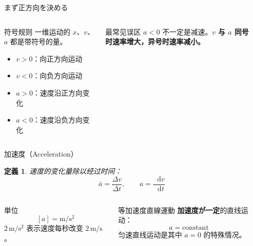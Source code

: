 \documentclass[notheorems,aspectratio=169]{beamer}
\newtheorem{definition}{定義}
\newcommand{\jp}[1]{\textbf{\color{JapanBlue}#1}}
\newcommand{\key}[1]{\textbf{\color{ChinaRed}#1}}
\newcommand{\dd}{\mathop{}\!\mathrm{d}}
\newcommand{\unit}[1]{\,\mathrm{#1}}
\begin{document}
\begin{frame}{まず正方向を決める}
  \begin{columns}[T,onlytextwidth]
    \begin{block}{符号规则}
      一维运动的 $x$、$v$、$a$ 都是带符号的量。
      \begin{itemize}
        \item $v>0$：向正方向运动
        \item $v<0$：向负方向运动
        \item $a>0$：速度沿正方向变化
        \item $a<0$：速度沿负方向变化
      \end{itemize}
    \end{block}
    \begin{alertblock}{最常见误区}
      $a<0$ 不一定是减速。\key{$v$ 与 $a$ 同号时速率增大，异号时速率减小。}
    \end{alertblock}

    \begin{center}
    \end{center}
  \end{columns}
\end{frame}

\begin{frame}{加速度（Acceleration）}
  \begin{definition}
    速度的变化量除以经过时间：
    \[
      \bar a=\frac{\Delta v}{\Delta t},
      \qquad
      a=\frac{\dd v}{\dd t}
    \]
  \end{definition}
  \begin{columns}[T,onlytextwidth]
    \begin{block}{単位}
      \[
        [a]=\mathrm{m/s^2}
      \]
      $2\unit{m/s^2}$ 表示速度每秒改变 $2\unit{m/s}$。
    \end{block}
    \begin{exampleblock}{等加速度直線運動}
      \jp{加速度が一定}的直线运动：
      \[
        a=\text{constant}
      \]
      匀速直线运动是其中 $a=0$ 的特殊情况。
    \end{exampleblock}
  \end{columns}
\end{frame}
\end{document}
